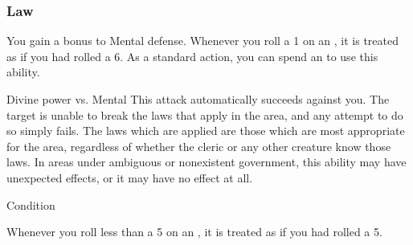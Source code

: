         \subsubsection{Law}
             You gain a  bonus to Mental defense.
             Whenever you roll a 1 on an , it is treated as if you had rolled a 6.
             As a standard action, you can spend an  to use this ability.
            \begin{ability}
                \begin{spelltargetinginfo}
                \end{spelltargetinginfo}
                \begin{spelleffects}
                    \begin{spellattack}{Divine power vs. Mental}
                        \spellspecial This attack automatically succeeds against you.
                        \spellsuccess The target is unable to break the laws that apply in the area, and any attempt to do so simply fails.
                        The laws which are applied are those which are most appropriate for the area, regardless of whether the cleric or any other creature know those laws.
                        In areas under ambiguous or nonexistent government, this ability may have unexpected effects, or it may have no effect at all.
                    \end{spellattack}
                    \spelldur Condition
                \end{spelleffects}
            \end{ability}
             Whenever you roll less than a 5 on an , it is treated as if you had rolled a 5.

